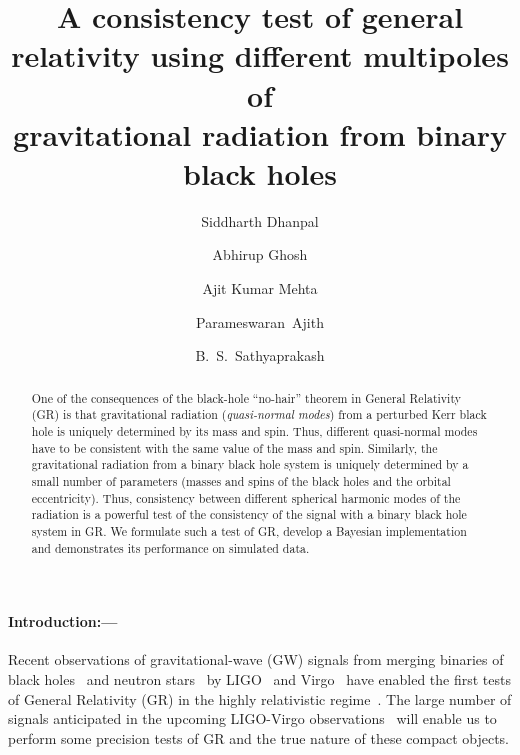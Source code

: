 \documentclass[prl,preprintnumbers,twocolumn,eqsecnum,floatfix,a4paper,nofootinbib,superscriptaddress]{revtex4}
\begin{document}
\title{A consistency test of general relativity using different multipoles of \\gravitational radiation from binary black holes}
\author{Siddharth Dhanpal}
\author{Abhirup Ghosh}
\author{Ajit Kumar Mehta}
\author{Parameswaran~Ajith}
\author{B.~S.~Sathyaprakash}

\begin{abstract}
One of the consequences of the black-hole ``no-hair'' theorem in General Relativity (GR) is that gravitational radiation (\emph{quasi-normal modes}) from a perturbed Kerr black hole is uniquely determined by its mass and spin. Thus, different quasi-normal modes have to be consistent with the same value of the mass and spin. Similarly, the gravitational radiation from a binary black hole system is uniquely determined by a small number of parameters (masses and spins of the black holes and the orbital eccentricity). Thus, consistency between different spherical harmonic modes of the radiation is a powerful test of the consistency of the signal with a binary black hole system in GR. We formulate such a test of GR, develop a Bayesian implementation and demonstrates its performance on simulated data. 
\end{abstract}
\maketitle
\paragraph{Introduction:---}

Recent observations of gravitational-wave (GW) signals from merging binaries of black holes~\cite{gw150914, gw151226, gw170104, gw170814} and neutron stars~\cite{gw170817} by LIGO~\cite{advancedLIGO-2015} and Virgo~\cite{advancedVIRGO-2015} have enabled the first tests of General Relativity (GR) in the highly relativistic regime~\cite{tgr-papers}. The large number of signals anticipated in the upcoming LIGO-Virgo observations~\cite{rates} will enable us to perform some precision tests of GR and the true nature of these compact objects. 
\end{document}
